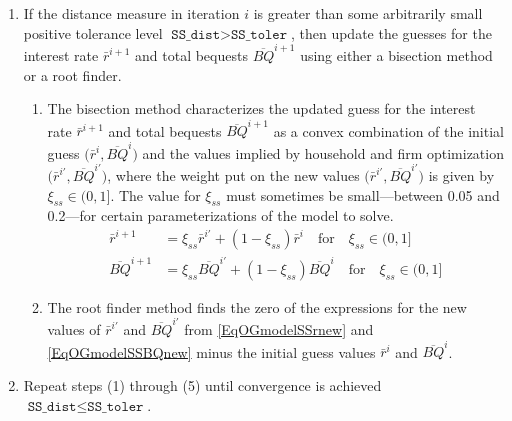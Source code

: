 \documentclass[letterpaper,12pt]{article}
\theoremstyle{definition}
\begin{document}
\begin{enumerate}
\begin{enumerate}
          \item If the distance measure in iteration $i$ is greater than some arbitrarily small positive tolerance level $\texttt{SS\_dist} > \texttt{SS\_toler}$, then update the guesses for the interest rate $\bar{r}^{i+1}$ and total bequests $\overline{BQ}^{i+1}$ using either a bisection method or a root finder.
          \begin{enumerate}
            \item The bisection method characterizes the updated guess for the interest rate $\bar{r}^{i+1}$ and total bequests $\overline{BQ}^{i+1}$ as a convex combination of the initial guess $\bigl(\bar{r}^{i},\overline{BQ}^i\bigr)$ and the values implied by household and firm optimization $\bigl(\bar{r}^{i'},\overline{BQ}^{i'}\bigr)$, where the weight put on the new values $\bigl(\bar{r}^{i'},\overline{BQ}^{i'}\bigr)$ is given by $\xi_{ss}\in(0, 1]$. The value for $\xi_{ss}$ must sometimes be small---between 0.05 and 0.2---for certain parameterizations of the model to solve.
            \begin{align}
              \bar{r}^{i+1} &= \xi_{ss}\bar{r}^{i'} + (1 - \xi_{ss})\bar{r}^{i} \quad\text{for}\quad \xi_{ss}\in(0,1] \label{EqOGmodelUpdate_r_bi} \\
              \overline{BQ}^{i+1} &= \xi_{ss}\overline{BQ}^{i'} + (1 - \xi_{ss})\overline{BQ}^{i} \quad\text{for}\quad \xi_{ss}\in(0,1] \label{EqOGmodelUpdate_BQ_bi}
            \end{align}

            \item The root finder method finds the zero of the expressions for the new values of $\bar{r}^{i'}$ and $\overline{BQ}^{i'}$ from \eqref{EqOGmodelSSrnew} and \eqref{EqOGmodelSSBQnew} minus the initial guess values $\bar{r}^{i}$ and $\overline{BQ}^{i}$.
          \end{enumerate}

          \item Repeat steps (1) through (5) until convergence is achieved $\texttt{SS\_dist}\leq\texttt{SS\_toler}$.

        \end{enumerate}
    \end{enumerate}
\end{document}
